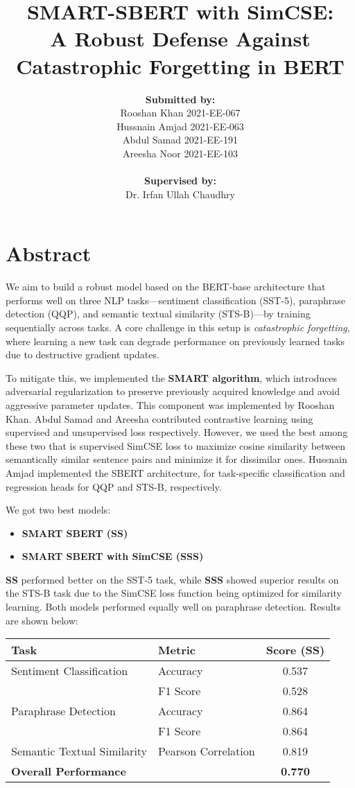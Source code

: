 \documentclass[12pt]{article}
\title{
    \textbf{SMART-SBERT with SimCSE:}\\
    \textbf{A Robust Defense Against Catastrophic Forgetting in BERT}
}
\author{
    \textbf{Submitted by:} \\
    Rooshan Khan \hfill 2021-EE-067 \\
    Hussnain Amjad \hfill 2021-EE-063 \\
    Abdul Samad \hfill 2021-EE-191 \\
    Areesha Noor \hfill 2021-EE-103 \\
    \\
    \textbf{Supervised by:} \\
    Dr. Irfan Ullah Chaudhry
}
\date{}
\begin{document}
\maketitle
\onehalfspacing

\section*{Abstract}
We aim to build a robust model based on the BERT-base architecture that performs well on three NLP tasks—sentiment classification (SST-5), paraphrase detection (QQP), and semantic textual similarity (STS-B)—by training sequentially across tasks. A core challenge in this setup is \textit{catastrophic forgetting}, where learning a new task can degrade performance on previously learned tasks due to destructive gradient updates.

To mitigate this, we implemented the \textbf{SMART algorithm}, which introduces adversarial regularization to preserve previously acquired knowledge and avoid aggressive parameter updates. This component was implemented by Rooshan Khan. Abdul Samad and Areesha contributed contrastive learning using supervised and unsupervised loss respectively. However, we used the best among these two that is supervised SimCSE loss to maximize cosine similarity between semantically similar sentence pairs and minimize it for dissimilar ones. Hussnain Amjad implemented the SBERT architecture, for task-specific classification and regression heads for QQP and STS-B, respectively.

We got two best models:
\begin{itemize}
    \item \textbf{SMART SBERT (SS)}
    \item \textbf{SMART SBERT with SimCSE (SSS)}
\end{itemize}

\textbf{SS} performed better on the SST-5 task, while \textbf{SSS} showed superior results on the STS-B task due to the SimCSE loss function being optimized for similarity learning. Both models performed equally well on paraphrase detection. Results are shown below:

\begin{table}[H]
\centering
\begin{tabular}{|l|l|c|}
\hline
\textbf{Task} & \textbf{Metric} & \textbf{Score (SS)} \\
\hline
Sentiment Classification & Accuracy & 0.537 \\
                         & F1 Score & 0.528 \\
\hline
Paraphrase Detection     & Accuracy & 0.864 \\
                         & F1 Score & 0.864 \\
\hline
Semantic Textual Similarity & Pearson Correlation & 0.819 \\
\hline
\textbf{Overall Performance} &  & \textbf{0.770} \\
\hline
\end{tabular}
\end{table}
\end{document}
